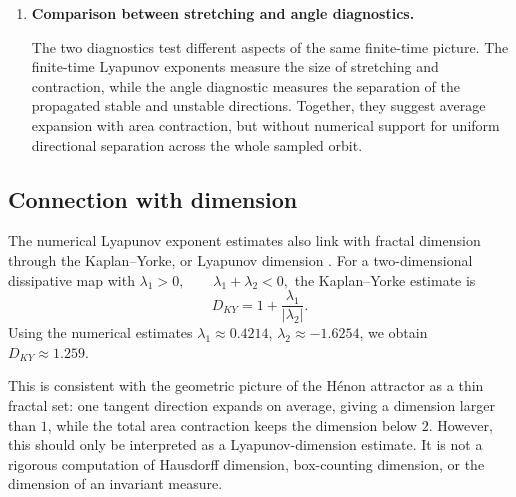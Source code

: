 \begin{enumerate}
    
    


    Overall, the angle diagnostic gives a mixed conclusion. Most sampled points have well-separated finite-time directions, which is consistent with hyperbolic-type tangent behaviour on a large part of the attractor. However, the persistent small-angle lower tail means that the computation does not support a numerical uniform lower bound on directional separation. The distribution of small-angle points suggests that the loss of transversality is likely to be tied to specific folded regions of the attractor. Thus the angle diagnostic supports a picture of non-uniform finite-time tangent geometry: directional separation is typical, but not uniform across the sampled attractor. This should be interpreted as non-uniform finite-time tangent behaviour, not as a proof of non-uniform hyperbolicity for the classical Hénon parameter.

    
    \item \textbf{Comparison between stretching and angle diagnostics.}

    The two diagnostics test different aspects of the same finite-time picture. The finite-time Lyapunov exponents measure the size of stretching and contraction, while the angle diagnostic measures the separation of the propagated stable and unstable directions. Together, they suggest average expansion with area contraction, but without numerical support for uniform directional separation across the whole sampled orbit.


    

    
\end{enumerate}



\subsection{Connection with dimension}

The numerical Lyapunov exponent estimates also link with fractal dimension through the Kaplan--Yorke, or Lyapunov dimension \cite{EckmannRuelle1985}. For a two-dimensional dissipative map with
\(
\lambda_1>0,
\qquad
\lambda_1+\lambda_2<0,
\)
the Kaplan--Yorke estimate is
\[
D_{KY}
=
1+\frac{\lambda_1}{|\lambda_2|}.
\]
Using the numerical estimates $\lambda_1\approx 0.4214$, $\lambda_2\approx -1.6254$, we obtain
\(
D_{KY}\approx 1.259.
\)

This is consistent with the geometric picture of the Hénon attractor as a thin fractal set: one tangent direction expands on average, giving a dimension larger than \(1\), while the total area contraction keeps the dimension below \(2\). However, this should only be interpreted as a Lyapunov-dimension estimate. It is not a rigorous computation of Hausdorff dimension, box-counting dimension, or the dimension of an invariant measure.


